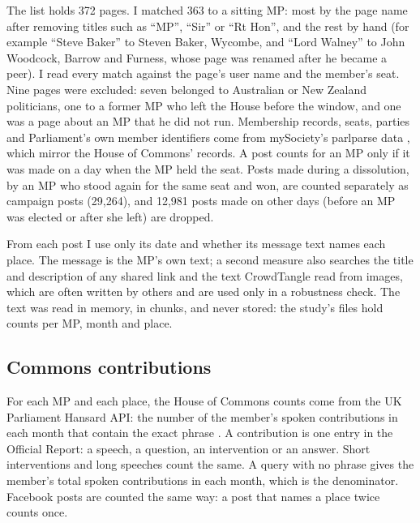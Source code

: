 \documentclass[11pt,a4paper]{article}
\begin{document}
The list holds 372 pages. I matched 363 to a sitting MP: most by the page name after removing titles such as ``MP'', ``Sir'' or ``Rt Hon'', and the rest by hand (for example ``Steve Baker'' to Steven Baker, Wycombe, and ``Lord Walney'' to John Woodcock, Barrow and Furness, whose page was renamed after he became a peer). I read every match against the page's user name and the member's seat. Nine pages were excluded: seven belonged to Australian or New Zealand politicians, one to a former MP who left the House before the window, and one was a page about an MP that he did not run. Membership records, seats, parties and Parliament's own member identifiers come from mySociety's parlparse data \citep{parlparse2026}, which mirror the House of Commons' records. A post counts for an MP only if it was made on a day when the MP held the seat. Posts made during a dissolution, by an MP who stood again for the same seat and won, are counted separately as campaign posts (29,264), and 12,981 posts made on other days (before an MP was elected or after she left) are dropped.

From each post I use only its date and whether its message text names each place. The message is the MP's own text; a second measure also searches the title and description of any shared link and the text CrowdTangle read from images, which are often written by others and are used only in a robustness check. The text was read in memory, in chunks, and never stored: the study's files hold counts per MP, month and place.

\subsection{Commons contributions}
For each MP and each place, the House of Commons counts come from the UK Parliament Hansard API: the number of the member's spoken contributions in each month that contain the exact phrase \citep{hansard2026}. A contribution is one entry in the Official Report: a speech, a question, an intervention or an answer. Short interventions and long speeches count the same. A query with no phrase gives the member's total spoken contributions in each month, which is the denominator. Facebook posts are counted the same way: a post that names a place twice counts once.
\end{document}
